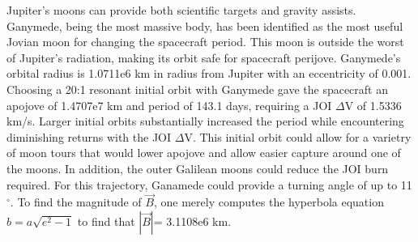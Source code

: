 \documentclass[]{aiaa-tc}%
\begin{document}
	\vspace{5 mm}

Jupiter's moons can provide both scientific targets and gravity assists. Ganymede, being the most massive body, has been identified as the most useful Jovian moon for changing the spacecraft period\cite{Damario}. This moon is outside the worst of Jupiter's radiation, making its orbit safe for spacecraft perijove. Ganymede's orbital radius is 1.0711e6 km in radius from Jupiter with an eccentricity of 0.001\cite{Damario}. Choosing a 20:1 resonant initial orbit with Ganymede gave the spacecraft an apojove of 1.4707e7 km and period of 143.1 days, requiring a JOI $\Delta$V of 1.5336 km/s. Larger initial orbits substantially increased the period while encountering diminishing returns with the JOI $\Delta$V. This initial orbit could allow for a varietry of moon tours that would lower apojove and allow easier capture around one of the moons. In addition, the outer Galilean moons could reduce the JOI burn required. For this trajectory, Ganamede could provide a turning angle of up to 11$^\circ$. To find the magnitude of $\vec{B}$, one merely computes the hyperbola equation $b=a\sqrt{e^2-1}$ to find that $\left |{\vec{B}}  \right |$= 3.1108e6 km.
	
	\vspace{5 mm}
\end{document}
